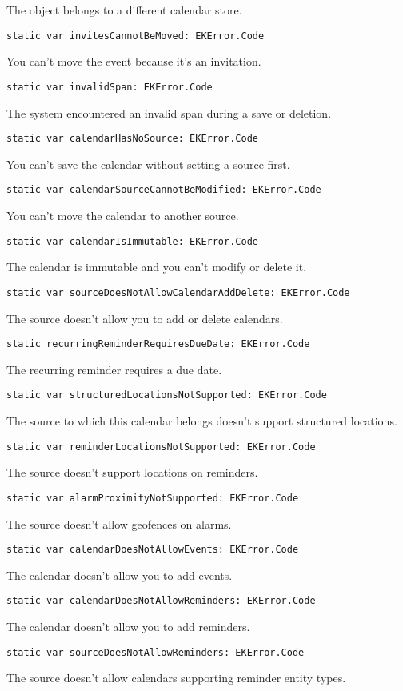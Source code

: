 \documentclass{article}
\begin{document}
The object belongs to a different calendar store.

\texttt{static var invitesCannotBeMoved: EKError.Code}

You can't move the event because it's an invitation.

\texttt{static var invalidSpan: EKError.Code}

The system encountered an invalid span during a save or deletion.

\texttt{static var calendarHasNoSource: EKError.Code}

You can't save the calendar without setting a source first.

\texttt{static var calendarSourceCannotBeModified: EKError.Code}

You can't move the calendar to another source.

\texttt{static var calendarIsImmutable: EKError.Code}

The calendar is immutable and you can't modify or delete it.

\texttt{static var sourceDoesNotAllowCalendarAddDelete: EKError.Code}

The source doesn't allow you to add or delete calendars.

\texttt{static recurringReminderRequiresDueDate: EKError.Code}

The recurring reminder requires a due date.

\texttt{static var structuredLocationsNotSupported: EKError.Code}

The source to which this calendar belongs doesn't support structured locations.

\texttt{static var reminderLocationsNotSupported: EKError.Code}

The source doesn't support locations on reminders.

\texttt{static var alarmProximityNotSupported: EKError.Code}

The source doesn't allow geofences on alarms.

\texttt{static var calendarDoesNotAllowEvents: EKError.Code}

The calendar doesn't allow you to add events.

\texttt{static var calendarDoesNotAllowReminders: EKError.Code}

The calendar doesn't allow you to add reminders.

\texttt{static var sourceDoesNotAllowReminders: EKError.Code}

The source doesn't allow calendars supporting reminder entity types.
\end{document}
